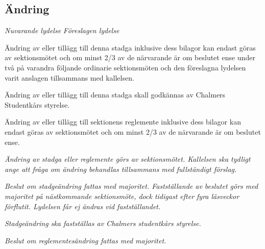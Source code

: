 \documentclass{article}
\newenvironment{lydelse}
    {\begin{paracol}{2}%
        \emph{Nuvarande lydelse}%
        \switchcolumn%
        \emph{Föreslagen lydelse}%
    \end{paracol}%
    \begin{enumerate}[label=\thesubsection.\arabic*]%
    \begin{paracol}{2}%
    }{\end{paracol}\end{enumerate}}
\begin{document}
\subsection{Ändring}
\begin{lydelse}
  \setcounter{section}{14}
  \setcounter{subsection}{2}
  \item Ändring av eller tillägg till denna stadga inklusive dess bilagor kan endast göras av sektionsmötet och om minst 2/3 av de närvarande är om beslutet ense under två på varandra följande ordinarie sektionsmöten och den föreslagna lydelsen varit anslagen tillsammans med kallelsen. \label{15.1:ändring}
  \item Ändring av eller tillägg till denna stadga skall godkännas av Chalmers Studentkårs styrelse.
  \setcounter{subsection}{3}
  \setcounter{enumi}{0}  
  \item Ändring av eller tillägg till sektionens reglemente inklusive dess bilagor kan endast göras av sektionsmötet och om minst 2/3 av de närvarande är om beslutet ense.
  \switchcolumn
  \item \emph{Ändring av stadga eller reglemente görs av sektionsmötet. Kallelsen ska tydligt ange att fråga om ändring behandlas tillsammans med fullständigt förslag.}
  \item \emph{Beslut om stadgeändring fattas med  majoritet.
      Fastställande av beslutet görs med  majoritet på nästkommande sektionsmöte, dock tidigast efter fyra läsveckor förflutit.
      Lydelsen får ej ändras vid fastställandet.} \label{maj:sä}
  \item \emph{Stadgeändring ska fastställas av Chalmers studentkårs styrelse.}
  \item \emph{Beslut om reglementesändring fattas med  majoritet.} \label{maj:rä}
\end{lydelse}
\setcounter{section}{15}
\setcounter{subsection}{2}
\end{document}
